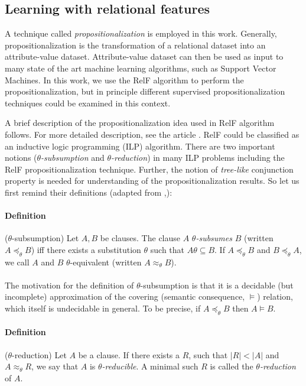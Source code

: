 \documentclass[11pt,twoside,a4paper]{book}
\newcounter{Definition}
\begin{document}
\subsection{Learning with relational features}
A technique called \emph{propositionalization} is employed in this work. 
Generally, propositionalization is the transformation of a relational dataset
into an attribute-value dataset.
Attribute-value dataset can then be used as input to many
state of the art machine learning algorithms, such as 
Support Vector Machines.
In this work, we use the RelF algorithm to perform the propositionalization,
but in principle different supervised propositionalization
techniques could be examined in this context.

A brief description of the propositionalization idea used in RelF algorithm follows.
For more detailed description, see the article \cite{relf}.
RelF could be classified as an inductive logic programming (ILP) algorithm.
There are two important notions (\emph{$\theta$-subsumption} and \emph{$\theta$-reduction})
in many ILP problems including the RelF propositionalization technique.
Further, the notion of \emph{tree-like} conjunction property is needed 
for understanding of the propositionalization results.
So let us first remind their definitions (adapted from \cite{szabova},\cite{relf}): 

\paragraph{Definition} ($\theta$-subsumption) Let $A,B$ be clauses. 
The clause $A$ \emph{$\theta$-subsumes} $B$ (written $A \preceq_{\theta} B$)
iff there exists a substitution $\theta$ such that $ A \theta \subseteq B$.
If $A \preceq_{\theta} B$ and $B \preceq_{\theta} A$, we call $A$ and $B$ 
$\theta$-equivalent (written $A \approx_{\theta} B$).

\paragraph{ } The motivation for the definition of $\theta$-subsumption is that it is a decidable
(but incomplete) approximation of the covering (semantic consequence, $\vDash$) relation,
which itself is undecidable in general.
To be precise, if $A \preceq_{\theta} B$ then $A \vDash B$. \cite{plotkin}

\paragraph{Definition} ($\theta$-reduction) Let $A$ be a clause.
If there exists a $R$, such that $|R| < |A|$ and $A \approx_{\theta} R$,
we say that $A$ is \emph{$\theta$-reducible}. 
A minimal such $R$ is called the \emph{$\theta$-reduction} of $A$.
\end{document}
